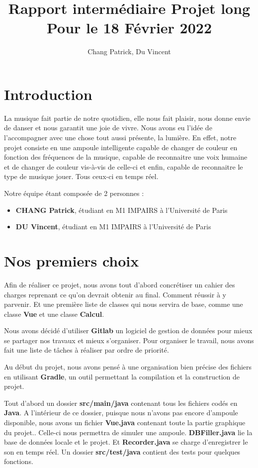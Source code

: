 \documentclass{article}
\title{Rapport intermédiaire Projet long\\ Pour le 18 Février 2022}
\author{Chang Patrick, Du Vincent}
\begin{document}
\maketitle


\section{Introduction}
La musique fait partie de notre quotidien, elle nous fait plaisir,
nous donne envie de danser et nous garantit une joie de vivre.
Nous avons eu l’idée de l’accompagner avec une chose tout aussi présente, la lumière.
En effet, notre projet consiste en une ampoule intelligente capable de changer de couleur en
fonction des fréquences de la musique, capable de reconnaitre une voix humaine et de changer
de couleur vis-à-vis de celle-ci et enfin, capable de reconnaitre le type de musique jouer.
Tous ceux-ci en temps réel.


Notre équipe étant composée de 2 personnes :

\begin{itemize}
\item {\bf CHANG Patrick}, étudiant en M1 IMPAIRS à l'Université de Paris
\item {\bf DU Vincent}, étudiant en M1 IMPAIRS à l'Université de Paris
\end{itemize}

\section{Nos premiers choix}
\label{sec:latex-examples}
Afin de réaliser ce projet, nous avons tout d'abord concrétiser un cahier
des charges reprenant ce qu'on devrait obtenir au final.
Comment réussir à y parvenir.
Et une première liste de classes qui nous servira de base,
comme une classe {\bf Vue} et une classe {\bf Calcul}.

Nous avons décidé d'utiliser {\bf Gitlab} un logiciel de gestion de données
pour mieux se partager nos travaux et mieux s'organiser.
Pour organiser le travail, nous avons fait une liste de tâches
à réaliser par ordre de priorité.

Au début du projet, nous avons pensé à une organisation bien précise des fichiers
en utilisant {\bf Gradle}, un outil permettant la compilation et la construction de projet. 


Tout d'abord un dossier {\bf src/main/java} contenant tous les fichiers codés en {\bf Java}.
A l'intérieur de ce dossier, puisque nous n’avons pas encore d’ampoule disponible,
nous avons un fichier {\bf Vue.java} contenant toute la partie graphique du projet..
Celle-ci nous permettra de simuler une ampoule. {\bf DBFiller.java} lie la base de données locale
et le projet. Et {\bf Recorder.java} se charge d’enregistrer le son en temps réel.
Un dossier {\bf src/test/java} contient des tests pour quelques fonctions.
\end{document}
